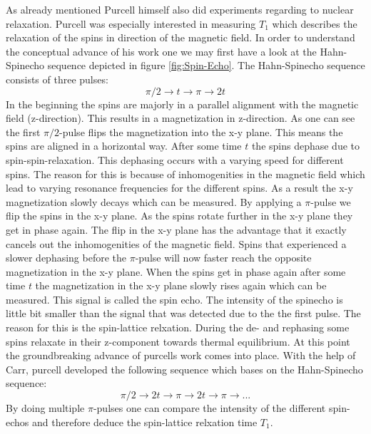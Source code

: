 \documentclass{article}
\begin{document}
As already mentioned Purcell himself also did experiments regarding to nuclear relaxation. Purcell was especially interested in measuring $T_1$  which describes the relaxation of the spins in direction of the magnetic field. In order to understand the conceptual advance of his work one we may first have a look at the Hahn-Spinecho sequence depicted in figure \ref{fig:Spin-Echo}. The Hahn-Spinecho sequence consists of three pulses:
\begin{equation*}
    \pi/2\rightarrow t \rightarrow \pi \rightarrow 2t
\end{equation*}
In the beginning the spins are majorly in a parallel alignment with the magnetic field (z-direction). This results in a magnetization in z-direction. As one can see the first $\pi/2$-pulse flips the magnetization into the x-y plane. This means the spins are aligned in a horizontal way. After some time $t$ the spins dephase due to spin-spin-relaxation. This dephasing occurs with a varying speed for different spins. The reason for this is because of inhomogenities in the magnetic field which lead to varying resonance frequencies for the different spins. As a result the x-y magnetization slowly decays which can be measured. By applying a $\pi$-pulse we flip the spins in the x-y plane. As the spins rotate further in the x-y plane they get in phase again. The flip in the x-y plane has the advantage that it exactly cancels out the inhomogenities of the magnetic field. Spins that experienced a slower dephasing before the $\pi$-pulse will now faster reach the opposite magnetization in the x-y plane. When the spins get in phase again after some time $t$ the magnetization in the x-y plane slowly rises again which can be measured. This signal is called the spin echo. The intensity of the spinecho is little bit smaller than the signal that was detected due to the the first pulse. The reason for this is the spin-lattice relxation. During the de- and rephasing some spins relaxate in their z-component towards thermal equilibrium. At this point the groundbreaking advance of purcells work comes into place. With the help of Carr, purcell developed the following sequence which bases on the Hahn-Spinecho sequence:
\begin{equation*}
    \pi/2\rightarrow 2t \rightarrow \pi \rightarrow 2t \rightarrow \pi \rightarrow ...
\end{equation*}
By doing multiple $\pi$-pulses one can compare the intensity of the different spin-echos and therefore deduce the spin-lattice relxation time $T_1$.
\end{document}
